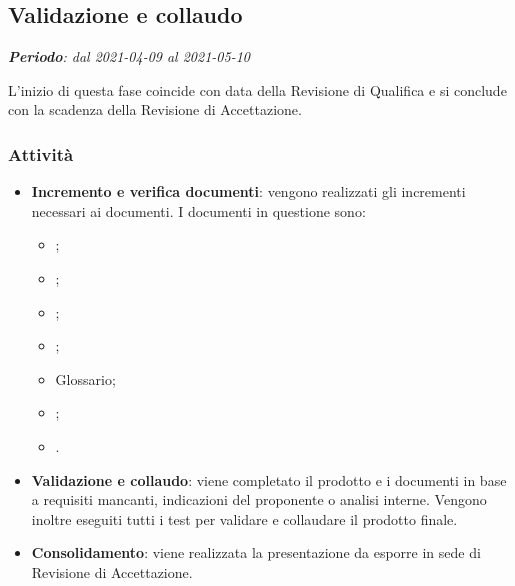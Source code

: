 \subsection{Validazione e collaudo}
\textit{\textbf{Periodo}: dal 2021-04-09 al 2021-05-10}

L'inizio di questa fase coincide con data della Revisione di Qualifica e si conclude con la scadenza della Revisione di Accettazione.

\subsubsection{Attività}

\begin{itemize}
\item \textbf{Incremento e verifica documenti}: vengono realizzati gli incrementi necessari ai documenti. I documenti in questione sono:
\begin{itemize}
\item \NdP{};
\item \AdR{};
\item \PdQ{};
\item \PdP{};
\item Glossario;
\item \MU{};
\item \MM{}.
\end{itemize}
\item \textbf{Validazione e collaudo}: viene completato il prodotto e i documenti in base a requisiti mancanti, indicazioni del proponente o analisi interne. Vengono inoltre eseguiti tutti i test per validare e collaudare il prodotto finale.
\item \textbf{Consolidamento}: viene realizzata la presentazione da esporre in sede di Revisione di Accettazione.
\end{itemize}



